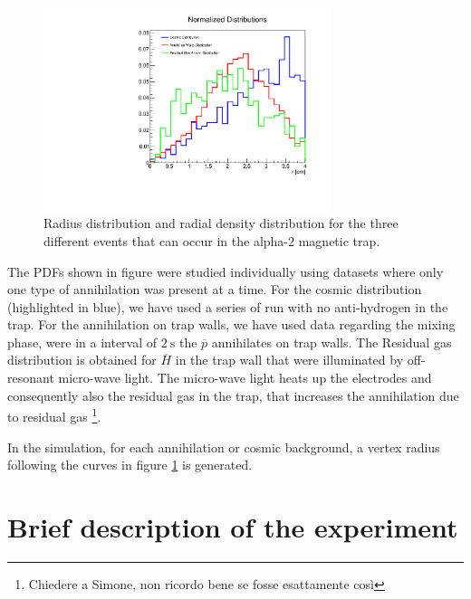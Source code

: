 \documentclass[11pt,a4paper,oneside]{article}
\begin{document}
\begin{figure}[!hbtp]
\centering
\includegraphics[width = 0.75\textwidth]{PdfTogether.pdf}
\caption{Radius distribution and radial density distribution for the three different events that can occur in the alpha-2 magnetic trap.}
\label{fig:RadiusDistributions}
\end{figure}

The PDFs shown in figure were studied individually using datasets where only one type of annihilation was present at a time. For the cosmic distribution (highlighted in blue), we have used a series of run with no anti-hydrogen in the trap. For the annihilation on trap walls, we have used data regarding the mixing phase, were in a interval of $\SI{2}{\second}$ the $\overline{p}$ annihilates on trap walls. The Residual gas distribution is obtained for $\overline{H}$ in the trap wall that were illuminated by off-resonant micro-wave light. The micro-wave light heats up the electrodes and consequently also the residual gas in the trap, that increases the annihilation due to residual gas \footnote{Chiedere a Simone, non ricordo bene se fosse esattamente così}.

In the simulation, for each annihilation or cosmic background, a vertex radius following the curves in figure \ref{fig:RadiusDistributions} is generated.

\section{Brief description of the experiment}
\end{document}
